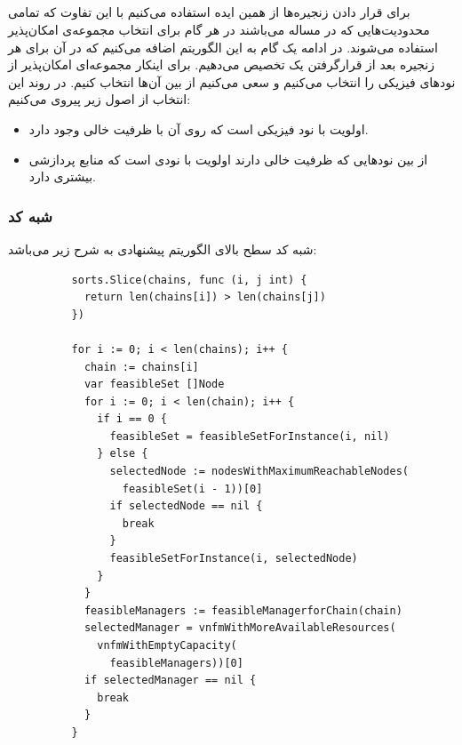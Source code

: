 \subsection{}

برای قرار دادن زنجیره‌ها از همین ایده استفاده می‌کنیم با این تفاوت
که تمامی محدودیت‌هایی که در مساله می‌باشند در هر گام برای انتخاب مجموعه‌ی امکان‌پذیر استفاده می‌شوند.
در ادامه یک گام به این الگوریتم اضافه می‌کنیم که در آن برای هر زنجیره بعد از قرارگرفتن یک
تخصیص می‌دهیم. برای اینکار مجموعه‌ای امکان‌پذیر از نودهای فیزیکی را انتخاب می‌کنیم
و سعی می‌کنیم از بین آن‌ها انتخاب کنیم. در روند این انتخاب از اصول زیر پیروی می‌کنیم:

\begin{itemize}
    \item اولویت با نود فیزیکی است که روی آن  با ظرفیت خالی وجود دارد.
    \item از بین نودهایی که ظرفیت خالی دارند اولویت با نودی است که منابع پردازشی بیشتری دارد.
\end{itemize}

\subsubsection{شبه کد}

شبه کد سطح بالای الگوریتم پیشنهادی به شرح زیر می‌باشد:

\begin{latin}
    \begin{verbatim}
          sorts.Slice(chains, func (i, j int) {
            return len(chains[i]) > len(chains[j])
          })
          
          for i := 0; i < len(chains); i++ {
            chain := chains[i]
            var feasibleSet []Node
            for i := 0; i < len(chain); i++ {
              if i == 0 {
                feasibleSet = feasibleSetForInstance(i, nil)
              } else {
                selectedNode := nodesWithMaximumReachableNodes(
                  feasibleSet(i - 1))[0]
                if selectedNode == nil {
                  break
                }
                feasibleSetForInstance(i, selectedNode)
              }
            }
            feasibleManagers := feasibleManagerforChain(chain)
            selectedManager = vnfmWithMoreAvailableResources(
              vnfmWithEmptyCapacity(
                feasibleManagers))[0]
            if selectedManager == nil {
              break
            }
          }
    \end{verbatim}
\end{latin}

